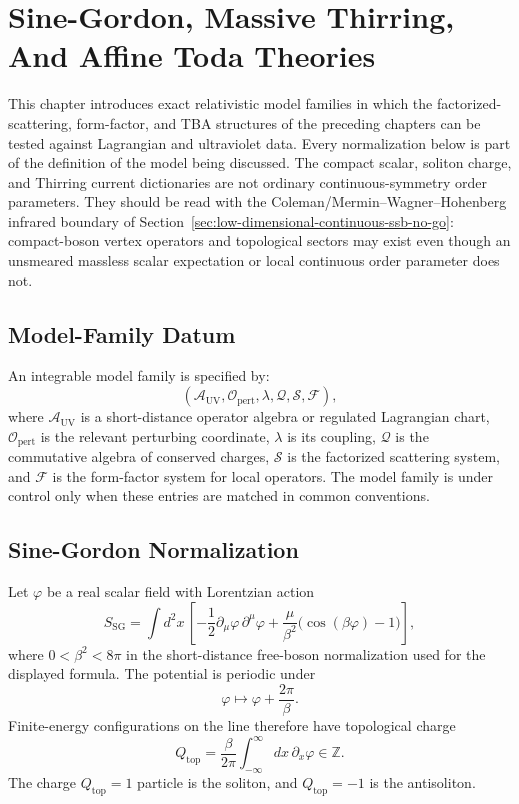 \chapter{Sine-Gordon, Massive Thirring, And Affine Toda Theories}
\label{ch:integrable-sine-gordon-thirring-affine-toda}

\ConventionsMixedCFT

This chapter introduces exact relativistic model families in which the
factorized-scattering, form-factor, and TBA structures of the preceding
chapters can be tested against Lagrangian and ultraviolet data.  Every
normalization below is part of the definition of the model being discussed.
The compact scalar, soliton charge, and Thirring current dictionaries are not
ordinary continuous-symmetry order parameters.  They should be read with the
Coleman/Mermin--Wagner--Hohenberg infrared boundary of
Section~\ref{sec:low-dimensional-continuous-ssb-no-go}: compact-boson vertex
operators and topological sectors may exist even though an unsmeared massless
scalar expectation or local continuous order parameter does not.

\section{Model-Family Datum}

An integrable model family is specified by:
\[
  (\mathcal A_{\mathrm{UV}},\mathcal O_{\mathrm{pert}},
  \lambda,\mathcal Q,\mathcal S,\mathcal F),
\]
where \(\mathcal A_{\mathrm{UV}}\) is a short-distance operator algebra or
regulated Lagrangian chart, \(\mathcal O_{\mathrm{pert}}\) is the relevant
perturbing coordinate, \(\lambda\) is its coupling, \(\mathcal Q\) is the
commutative algebra of conserved charges, \(\mathcal S\) is the factorized
scattering system, and \(\mathcal F\) is the form-factor system for local
operators.  The model family is under control only when these entries are
matched in common conventions.

\section{Sine-Gordon Normalization}

Let \(\varphi\) be a real scalar field with Lorentzian action
\[
  S_{\mathrm{SG}}
  =
  \int d^2x\,
  \left[
  -\frac12 \partial_\mu\varphi\,\partial^\mu\varphi
  +\frac{\mu}{\beta^2}\bigl(\cos(\beta\varphi)-1\bigr)
  \right],
\]
where \(0<\beta^2<8\pi\) in the short-distance free-boson normalization used
for the displayed formula.  The potential is periodic under
\[
  \varphi\longmapsto \varphi+\frac{2\pi}{\beta}.
\]
Finite-energy configurations on the line therefore have topological charge
\[
  Q_{\mathrm{top}}
  =
  \frac{\beta}{2\pi}
  \int_{-\infty}^{\infty}dx\,\partial_x\varphi
  \in\mathbb Z .
\]
The charge \(Q_{\mathrm{top}}=1\) particle is the soliton, and
\(Q_{\mathrm{top}}=-1\) is the antisoliton.

